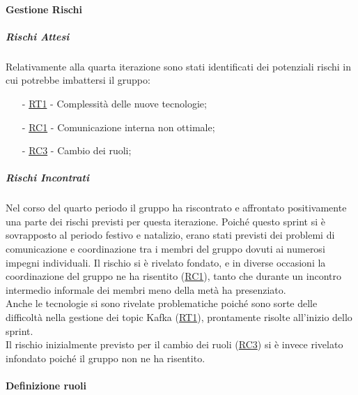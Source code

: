 \documentclass[10pt]{article}
\begin{document}
{{{{{    \paragraph{Gestione Rischi}\mbox{}
    \vspace{-1em}
    \subparagraph*{Rischi Attesi}\mbox{}
    Relativamente alla quarta iterazione sono stati identificati dei potenziali rischi in cui potrebbe imbattersi il gruppo:
    \vspace{-0.5em}
    \begin{itemize}
    \setlength\itemsep{-0.2em}
    \item [-] \hyperref[RT1]{RT1} - Complessità delle nuove tecnologie;
    \item [-] \hyperref[RC1]{RC1} - Comunicazione interna non ottimale;
    \item [-] \hyperref[RC3]{RC3} - Cambio dei ruoli;
    \end{itemize}

    \subparagraph*{Rischi Incontrati}\mbox{}

    Nel corso del quarto periodo il gruppo ha riscontrato e affrontato positivamente una parte dei rischi previsti per questa iterazione.
    Poiché questo sprint si è sovrapposto al periodo festivo e natalizio, erano stati previsti dei problemi di comunicazione e coordinazione
    tra i membri del gruppo dovuti ai numerosi impegni individuali. Il rischio si è rivelato fondato, e in diverse occasioni
    la coordinazione del gruppo ne ha risentito (\hyperref[RC1]{RC1}), tanto che durante un incontro intermedio informale dei membri 
    meno della metà ha presenziato.\\
    Anche le tecnologie si sono rivelate problematiche poiché sono sorte delle difficoltà nella gestione dei topic Kafka (\hyperref[RT1]{RT1}), 
    prontamente risolte all'inizio dello sprint.\\
    Il rischio inizialmente previsto per il cambio dei ruoli (\hyperref[RC3]{RC3}) si è invece rivelato infondato poiché il gruppo non ne ha risentito.
    
    \paragraph{Definizione ruoli}\mbox{}\vspace{0.4em}
    
}}}}}
\end{document}
